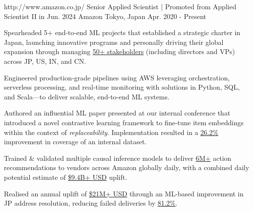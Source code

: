 

\begin{cventries}

  \cventry
    {http://www.amazon.co.jp/}
    {Senior Applied Scientist | Promoted from Applied Scientist II in Jun. 2024} %
    {Amazon} %
    {Tokyo, Japan} %
    {Apr. 2020 - Present} %
    {
      \begin{cvitems} %
        \item {Spearheaded 5+ end-to-end ML projects that established a strategic charter in Japan, launching innovative programs and personally driving their global expansion through managing \underline{50+ stakeholders} (including directors and VPs) across JP, US, IN, and CN.}
        \item {Engineered production-grade pipelines using AWS leveraging orchestration, serverless processing, and real-time monitoring with solutions in Python, SQL, and Scala—to deliver scalable, end-to-end ML systems.}
        \item {Authored an influential ML paper presented at our internal conference that introduced a novel contrastive learning framework to fine-tune item embeddings within the context of \textit{replaceability}. Implementation resulted in a \underline{26.2\%} improvement in coverage of an internal dataset.}
        \item {Trained \& validated multiple causal inference models to deliver \underline{6M+} action recommendations to vendors across Amazon globally daily, with a combined daily potential estimate of \underline{\$9.4B+ USD} uplift.}
        \item {Realised an annual uplift of \underline{\$21M+ USD} through an ML-based improvement in JP address resolution, reducing failed deliveries by \underline{81.2\%}.}
      \end{cvitems}
    }



\end{cventries}
